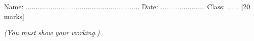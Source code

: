\documentclass{article}
\date{}
\begin{document}
\fontsize{13}{15} \selectfont %

\begin{center}
  \qquad \\ 
\end{center} \\ 

Name: ...........................................................  \hspace{0.5cm}  Date: ....................... \hspace{0.5cm}  Class: ......\hspace{0.5cm} [20 marks]

\par
\vspace*{5pt} 
\textit{(You must show your working.)  }
\vspace{5pt}
\end{document}
